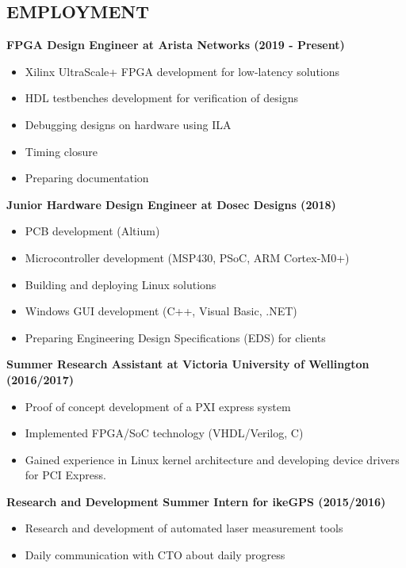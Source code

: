 \documentclass[3pt]{res}
\begin{document}
\begin{resume}
\section{EMPLOYMENT}
\vspace{0.1in}
  {\bf FPGA Design Engineer at Arista Networks (2019 - Present)}
    \begin{itemize}[noitemsep]
      \item Xilinx UltraScale+ FPGA development for low-latency solutions
      \item HDL testbenches development for verification of designs
      \item Debugging designs on hardware using ILA
      \item Timing closure
      \item Preparing documentation
    \end{itemize}
  {\bf Junior Hardware Design Engineer at Dosec Designs (2018)}
    \begin{itemize}[noitemsep]
      \item PCB development (Altium)
      \item Microcontroller development (MSP430, PSoC, ARM Cortex-M0+)
      \item Building and deploying Linux solutions
      \item Windows GUI development (C++, Visual Basic, .NET)
      \item Preparing Engineering Design Specifications (EDS) for clients
    \end{itemize}
  {\bf Summer Research Assistant at Victoria University of Wellington (2016/2017)}
    \begin{itemize}[noitemsep]
      \item Proof of concept development of a PXI express system
      \item Implemented FPGA/SoC technology (VHDL/Verilog, C)
      \item Gained experience in Linux kernel architecture and developing device drivers for PCI Express.
    \end{itemize}
  {\bf Research and Development Summer Intern for ikeGPS (2015/2016)}
    \begin{itemize}[noitemsep] %
      \item Research and development of automated laser measurement tools
      \item Daily communication with CTO about daily progress
    \end{itemize}


\end{resume}
\end{document}
